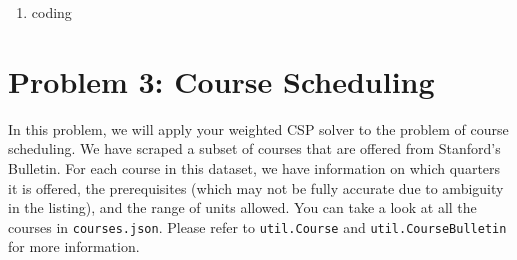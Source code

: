 \documentclass[10pt]{article}
\begin{document}
\begin{enumerate}[label=(\alph*)]
  \item coding

\end{enumerate}

\section*{\normalsize Problem 3: Course Scheduling}

In this problem, we will apply your weighted CSP solver to the problem of course scheduling. We have scraped a subset of courses that are offered from Stanford's Bulletin. For each course in this dataset, we have information on which quarters it is offered, the prerequisites (which may not be fully accurate due to ambiguity in the listing), and the range of units allowed. You can take a look at all the courses in \texttt{courses.json}. Please refer to \texttt{util.Course} and \texttt{util.CourseBulletin} for more information. 
\end{document}
